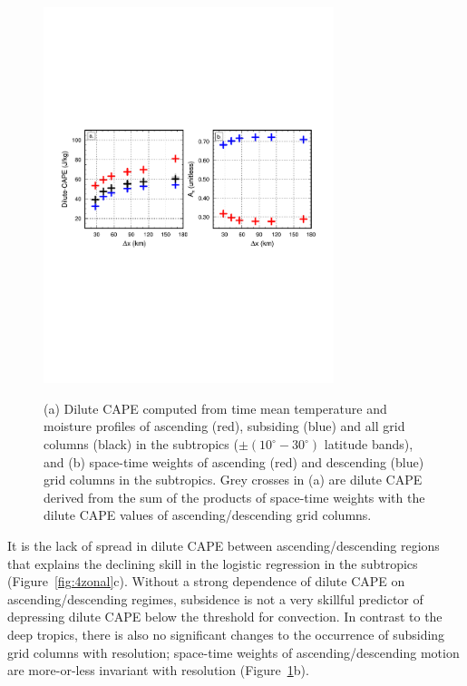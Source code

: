 \documentclass[times]{qjrms4}
\begin{document}
\begin{figure}
\begin{center}
\noindent\includegraphics[width=20pc,angle=0]{figs/temp_cape-subtropics.pdf}\\
\end{center}
\caption{(a) Dilute CAPE computed from time mean temperature and moisture profiles of ascending (red), subsiding (blue) and all grid columns (black) in the subtropics ($\pm \left(10^{\circ}-30^{\circ} \right)$ latitude bands), and (b) space-time weights of ascending (red) and descending (blue) grid columns in the subtropics. Grey crosses in (a) are dilute CAPE derived from the sum of the products of space-time weights with the dilute CAPE values of ascending/descending grid columns.}
\label{fig:cape-subt}
\end{figure}

It is the lack of spread in dilute CAPE between ascending/descending regions that explains the declining skill in the logistic regression in the subtropics (Figure~\ref{fig:4zonal}c). Without a strong dependence of dilute CAPE on ascending/descending regimes, subsidence is not a very skillful predictor of depressing dilute CAPE below the threshold for convection. In contrast to the deep tropics, there is also no significant changes to the occurrence of subsiding grid columns with resolution; space-time weights of ascending/descending motion are more-or-less invariant with resolution (Figure~\ref{fig:cape-subt}b).
\end{document}
